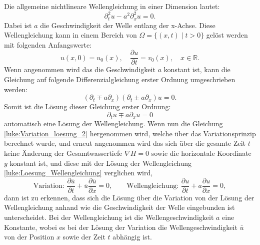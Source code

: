 Die allgemeine nichtlineare Wellengleichung in einer Dimension lautet:
\[
\partial_t^2 u - a^2 \partial_x^2 u  = 0.
\]
Dabei ist $a$ die Geschwindigkeit der Welle entlang der x-Achse.
Diese Wellengleichung kann in einem Bereich von $\Omega = \{(x,t)\mid t >0\}$ gelöst werden mit folgenden Anfangswerte:
\[
u(x,0) = u_0(x),\quad \frac{\partial u}{\partial t} = v_0(x),\quad x \in \mathbb{R}.
\]
Wenn angenommen wird das die Geschwindigkeit $a$ konstant ist, kann die Gleichung auf folgende Differenzialgleichung erster Ordnung umgeschrieben werden:
\[
(\partial_t\mp a\partial_x)(\partial_t\pm a\partial_x) u  = 0.
\]
Somit ist die Lösung dieser Gleichung erster Ordnung:
\begin{equation}
	\partial_t u \mp a\partial_x u = 0
	\label{luke:Loesung_Wellengleichung}
\end{equation}
automatisch eine Lösung der Wellengleichung.
Wenn nun die Gleichung \eqref{luke:Variation_loesung_2} hergenommen wird, welche über das Variationsprinzip berechnet wurde, und erneut angenommen wird das sich über die gesamte Zeit $t$ keine Änderung der Gesamtwassertiefe $ \nabla H = 0 $ sowie die horizontale Koordinate $y$ konstant ist, und diese mit der Lösung der Wellengleichung \eqref{luke:Loesung_Wellengleichung} verglichen wird,
\[
\text{Variation: }\frac{\partial \bar{u}}{\partial t} + \bar{u} \frac{\partial \bar{u}}{\partial x} = 0,
\qquad
\text{Wellengleichung: }\frac{\partial u}{\partial t} + a \frac{\partial u}{\partial x} = 0,
\]
dann ist zu erkennen, dass sich die Lösung über die Variation von der Lösung der Wellengleichung anhand wie die Geschwindigkeit der Welle eingebunden ist unterscheidet.
Bei der Wellengleichung ist die Wellengeschwindigkeit $a$ eine Konstante, wobei es bei der Lösung der Variation die Wellengeschwindigkeit $\bar{u}$ von der Position $x$ sowie der Zeit $t$ abhängig ist.
